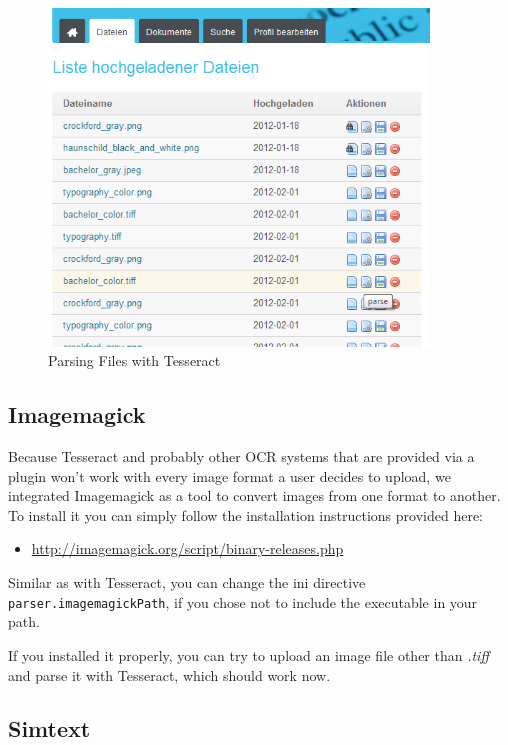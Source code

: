 \begin{figure}[htbp]
  \centering
    \includegraphics[width=0.9\textwidth]{images/parse-button.png}
  \caption{Parsing Files with Tesseract}
  \label{fig:parseButton}
\end{figure}

\subsection{Imagemagick}

Because Tesseract and probably other OCR systems that are provided via a plugin won't work with every image format a 
user decides to upload, we integrated Imagemagick as a tool to convert images from one format to another. To install
it you can simply follow the installation instructions provided here:

\begin{itemize}
\item \url{http://imagemagick.org/script/binary-releases.php}
\end{itemize}

Similar as with Tesseract, you can change the ini directive \texttt{parser.imagemagickPath}, if you chose not to include
the executable in your path.

If you installed it properly, you can try to upload an image file other than \textit{.tiff} and parse it with Tesseract,
which should work now.

\subsection{Simtext}

